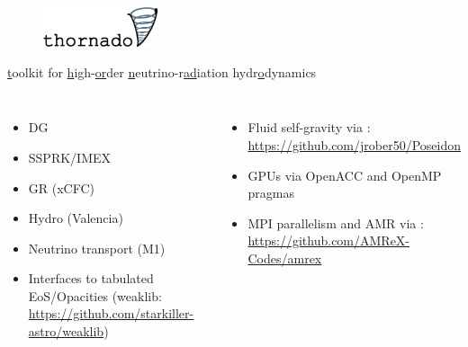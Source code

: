 \documentclass{beamer}
\begin{document}
\begin{frame}

  \begin{figure}[ht]
    \centering
    \includegraphics[width=0.3\textwidth]{fig.thornado_logo.png}
  \end{figure}

  \begin{center}

    \ul{t}oolkit for
    \ul{h}igh-\ul{or}der
    \ul{n}eutrino-r\ul{ad}iation hydr\ul{o}dynamics\\[1em]

    \begin{columns}[c]


        \begin{itemize}
          \item
            DG
          \item
            SSPRK/IMEX
          \item
            GR (xCFC)
          \item
            Hydro (Valencia)
          \item
            Neutrino transport (M1)
          \item
            Interfaces to tabulated EoS/Opacities
            (weaklib: \url{https://github.com/starkiller-astro/weaklib})
        \end{itemize}


        \begin{itemize}
          \item
            Fluid self-gravity via \poseidon:
            \url{https://github.com/jrober50/Poseidon}
          \item
            GPUs via OpenACC and OpenMP pragmas
          \item
            MPI parallelism and AMR via \amrex:
            \url{https://github.com/AMReX-Codes/amrex}
        \end{itemize}

    \end{columns}

  \end{center}

\end{frame}
\end{document}
